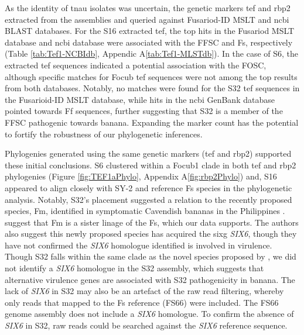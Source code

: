 As the identity of \ac{tnau} isolates was uncertain, the genetic markers \acf{tef} and \acf{rbp2} extracted from the assemblies and queried against Fusariod-ID MSLT and \ac{ncbi} BLAST databases. For the S16 extracted \ac{tef}, the top hits in the Fusariod MSLT database and \ac{ncbi} database were associated with the \ac{FFSC} and \ac{Fs}, respectively (Table \ref{tab:Tef1-NCBIdb}, Appendic A\ref{tab:Tef1-MLSTdb}). In the case of S6, the extracted \ac{tef} sequences indicated a potential association with the \ac{FOSC}, although specific matches for \ac{Focub} \ac{tef} sequences were not among the top results from both databases. Notably, no matches were found for the S32 \ac{tef} sequences in the Fusarioid-ID MSLT database, while hits in the \ac{ncbi} GenBank database pointed towards \ac{Ff} sequences, further suggesting that S32 is a member of the \ac{FFSC} pathogenic towards banana. Expanding the marker count has the potential to fortify the robustness of our phylogenetic inferences. 

Phylogenies generated using the same genetic markers (\ac{tef} and \ac{rbp2}) supported these initial conclusions. S6 clustered within a \ac{Focub1} clade in both \acs{tef} and \ac{rbp2} phylogenies (Figure \ref{fig:TEF1aPhylo}, Appendix A\ref{fig:rbp2Phylo}) and, S16 appeared to align closely with SY-2 and reference \ac{Fs} species in the phylogenetic analysis. Notably, S32's placement suggested a relation to the recently proposed species, \acf{Fm}, identified in symptomatic Cavendish bananas in the Philippines \parencite{Nozawa2023}. \textcite{Nozawa2023} suggest that \ac{Fm} is a sister linage of the \ac{Fs}, which our data supports. The authors also suggest this newly proposed species has acquired the \ac{sixg} \textit{SIX6}, though they have not confirmed the \textit{SIX6} homologue identified is involved in virulence. Though S32 falls within the same clade as the novel species proposed by \textcite{Nozawa2023}, we did not identify a \textit{SIX6} homologue in the S32 assembly, which suggests that alternative virulence genes are associated with S32 pathogenicity in banana. The lack of \textit{SIX6} in S32 may also be an artefact of the raw read filtering, whereby only reads that mapped to the \ac{Fs} reference (FS66) were included. The FS66 genome assembly does not include a \textit{SIX6} homologue. To confirm the absence of \textit{SIX6} in S32, raw reads could be searched against the \textit{SIX6} reference sequence. 


